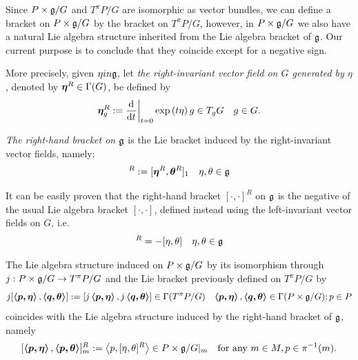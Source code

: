 Since $P \times \mathfrak{g}/G$ and $T^\pi P/G$ are isomorphic as vector bundles, we can define a bracket on $P \times \mathfrak{g}/G$ by the bracket on $T^\pi P/G$, however, in $P \times \mathfrak{g}/G$ we also have a natural Lie algebra structure inherited from the Lie algebra bracket of $\mathfrak{g}$. Our current purpose is to conclude that they coincide except for a negative sign.

\begin{definition}
 More precisely, given $\eta in \mathfrak{g}$, let \emph{the right-invariant vector field on $G$ generated by $\eta$}, denoted by $\bm{\eta}^R \in \Gamma(G)$, be defined by
\begin{align}
    \sect \eta^R_g := \der{}{t}[t = 0] \exp{(t \eta)}\, g \in T_g G && g \in G.
\end{align}

\emph{The right-hand bracket on $\mathfrak{g}$} is the Lie bracket induced by the right-invariant vector fields, namely:
\begin{align}
    [\eta, \theta]^R := [\sect \eta^R, \sect \theta^R]_1 && \eta, \theta \in \alg g
\end{align}
\end{definition}

It can be easily proven that the right-hand bracket $[\cdot, \cdot]^R$ on $\mathfrak{g}$ is the negative of the usual Lie algebra bracket $[\cdot, \cdot]$, defined instead using the left-invariant vector fields on $G$, i.e.
\begin{align}
    [\eta, \theta]^R = -[\eta, \theta] && \eta, \theta \in \alg g
\end{align}

\begin{theorem}\label{theoBracketAdjoint}
The Lie algebra structure induced on $P \times \mathfrak{g}/G$ by its isomorphism through $j: P \times \mathfrak{g}/G \to T^\pi P/G$ and the Lie bracket previously defined on $T^\pi P/G$ by
\begin{align} \label{eqnBraIndTpi}
    j[\bm{\left\langle p, \eta \right\rangle}, \bm{\left\langle q, \theta \right\rangle}] := [j\bm{\left\langle p, \eta \right\rangle}, j\bm{\left\langle q, \theta \right\rangle}] \in \Gamma(T^\pi P/G) && \bm{\left\langle p, \eta \right\rangle}, \bm{\left\langle q, \theta \right\rangle} \in \Gamma(P \times \mathfrak{g}/G); p \in P
\end{align}
coincides with the Lie algebra structure induced by the right-hand bracket of $\mathfrak{g}$, namely
\begin{align} \label{eqnBraIndg}
    [\bm{\left\langle p, \eta \right\rangle}, \bm{\left\langle p, \theta \right\rangle}]^R_m := \left\langle p, [\eta, \theta]^R \right\rangle \in P \times \mathfrak{g}/G|_m && \textrm{for any } m \in M, p \in \pi^{-1}(m).
\end{align}
\end{theorem}

